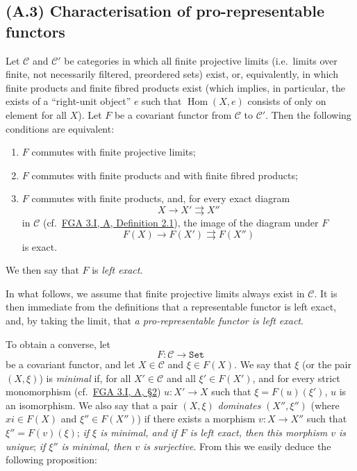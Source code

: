 \documentclass{article}
\providecommand{\tightlist}{%
  \setlength{\itemsep}{0pt}\setlength{\parskip}{0pt}}
\newcommand{\oldpage}[1]{\marginpar{\footnotesize$\Big\vert$ \textit{p.~#1}}}
\theoremstyle{definition}
\theoremstyle{definition}
\theoremstyle{definition}
\theoremstyle{definition}
\theoremstyle{remark}
\begin{document}
\hypertarget{fga-3-ii-section-A.3}{%
\subsection{(A.3) Characterisation of pro-representable functors}\label{fga-3-ii-section-A.3}}

Let \({\mathcal{C}}\) and \({\mathcal{C}}'\) be categories in which all finite projective limits (i.e.~limits over finite, not necessarily filtered, preordered sets) exist, or, equivalently, in which finite products and finite fibred products exist (which implies, in particular, the exists of a ``right-unit object'' \(e\) such that \(\operatorname{Hom}(X,e)\) consists of only on element for all \(X\)).
Let \(F\) be a covariant functor from \({\mathcal{C}}\) to \({\mathcal{C}}'\).
Then the following conditions are equivalent:

\begin{enumerate}
\def\labelenumi{\roman{enumi}.}
\tightlist
\item
  \(F\) commutes with finite projective limits;
\item
  \(F\) commutes with finite products and with finite fibred products;
\item
  \(F\) commutes with finite products, and, for every exact diagram
  \[
      X\to X'\rightrightarrows X''
    \]
  in \({\mathcal{C}}\) (cf.~\protect\hyperlink{fga-3-i-section-A.2-definition-2.1}{FGA 3.I, A, Definition 2.1}), the image of the diagram under \(F\)
  \[
      F(X)\to F(X')\rightrightarrows F(X'')
    \]
  is exact.
\end{enumerate}

We then say that \(F\) is \emph{left exact}.

In what follows, we assume that finite projective limits always exist in \({\mathcal{C}}\).
It is then immediate from the definitions that a representable functor is left exact, and, by taking the limit, that \emph{a pro-representable functor is left exact}.

To obtain a converse, let
\[
  F\colon {\mathcal{C}} \to \mathtt{Set}
\]
be a covariant functor, and let \(X\in{\mathcal{C}}\) and \(\xi\in F(X)\).
\oldpage{195-06}We say that \(\xi\) (or the pair \((X,\xi)\)) is \emph{minimal} if, for all \(X'\in{\mathcal{C}}\) and all \(\xi'\in F(X')\), and for every strict monomorphism (cf.~\protect\hyperlink{fga-3-i-section-A.2}{FGA 3.I, A, §2}) \(u\colon X'\to X\) such that \(\xi=F(u)(\xi')\), \(u\) is an isomorphism.
We also say that a pair \((X,\xi)\) \emph{dominates} \((X'',\xi'')\) (where \(xi\in F(X)\) and \(\xi''\in F(X'')\)) if there exists a morphism \(v\colon X\to X''\) such that \(\xi''=F(v)(\xi)\);
\emph{if \(\xi\) is minimal, and if \(F\) is left exact, then this morphism \(v\) is unique};
\emph{if \(\xi''\) is minimal, then \(v\) is surjective}.
From this we easily deduce the following proposition:
\end{document}
